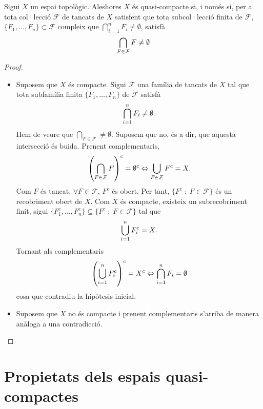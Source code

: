 \documentclass[../main.tex]{subfiles}
\begin{document}
\begin{ter}
\label{ter:defalternativadeqc} Sigui $X$ un espai topològic. Aleshores $X$ és quasi-compacte si, i només si, per a tota col·lecció $\mathcal{F}$ de tancats de $X$ satisfent que tota subcol·lecció finita de $\mathcal{F}$, $\{F_1,\ldots,F_n\}\subset\mathcal{F}$ compleix que $\bigcap_{i=1}^n F_i\not=\emptyset$, satisfà
\begin{equation}
    \notag
    \bigcap_{F\in\mathcal{F}} F\not=\emptyset
\end{equation}
\end{ter}
\begin{proof}
\begin{itemize}
    \item \fbox{$\Rightarrow$} Suposem que $X$ és compacte. Sigui $\mathcal{F}$ una família de tancats de $X$ tal que tota subfamília finita $\{F_1,\ldots,F_n\}$ de $\mathcal{F}$ satisfà
    \begin{equation}
        \notag
        \bigcap_{i=1}^n F_i\not=\emptyset.
    \end{equation}
    Hem de veure que $\bigcap_{F\in\mathcal{F}}\not=\emptyset$. Suposem que no, és a dir, que aquesta intersecció és buida. Prenent complementaris,
    \begin{equation}
        \notag
        \left(\bigcap_{F\in\mathcal{F}}F\right)^c = \emptyset^c \Leftrightarrow \bigcup_{F\in\mathcal{F}}F^c = X.
    \end{equation}
    Com $F$ és tancat, $\forall F\in\mathcal{F}$, $F^c$ és obert. Per tant, $\{F^c\;:\;F\in\mathcal{F}\}$ és un recobriment obert de $X$. Com $X$ és compacte, existeix un subrecobriment finit, sigui $\{F_1^c,\ldots,F_n^c\}\subseteq\{F^c\;:\;F\in\mathcal{F}\}$ tal que
    \begin{equation}
        \notag
        \bigcup_{i=1}^n F_i^c = X.
    \end{equation}
    Tornant als complementaris
    \begin{equation}
        \notag
        \left(\bigcup_{i=1}^n F_i^c\right)^c = X^c\Leftrightarrow \bigcap_{i=1}^n F_i = \emptyset
    \end{equation}
    cosa que contradiu la hipòtesis inicial.
    \item \fbox{$\Leftarrow$} Suposem que $X$ no és compacte i prenent complementaris s'arriba de manera anàloga a una contradicció.
\end{itemize}
\end{proof}

\section{Propietats dels espais quasi-compactes}
\end{document}
